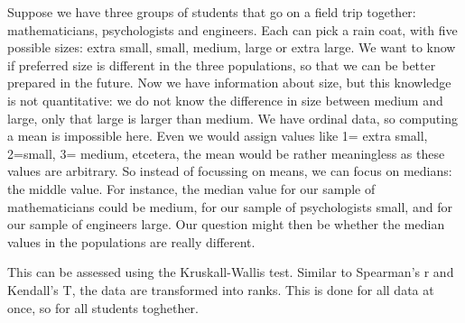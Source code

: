 \documentclass[]{report}\usepackage[]{graphicx}\usepackage[]{color}
\begin{document}
Suppose we have three groups of students that go on a field trip together: mathematicians, psychologists and engineers. Each can pick a rain coat, with five possible sizes: extra small, small, medium, large or extra large. We want to know if preferred size is different in the three populations, so that we can be better prepared in the future. Now we have information about size, but this knowledge is not quantitative: we do not know the difference in size between medium and large, only that large is larger than medium. We have ordinal data, so computing a mean is impossible here. Even we would assign values like 1= extra small, 2=small, 3= medium, etcetera, the mean would be rather meaningless as these values are arbitrary. So instead of focussing on means, we can focus on medians: the middle value. For instance, the median value for our sample of mathematicians could be medium, for our sample of psychologists small, and for our sample of engineers large. Our question might then be whether the median values in the populations are really different. 

This can be assessed using the Kruskall-Wallis test. Similar to Spearman's r and Kendall's T, the data are transformed into ranks. This is done for all data at once, so for all students toghether.
\end{document}

